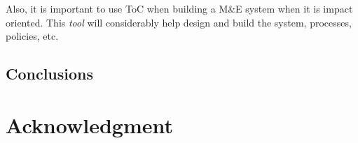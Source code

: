 \documentclass[conference]{IEEEtran}
\begin{document}
Also, it is important to use ToC when building a M\&E system when it is impact oriented. This \textit{tool} will considerably help design and build the system, processes, policies, etc.\cite{hearn_when_2016}

\subsection{Conclusions} 

\section*{Acknowledgment}
\vspace{12pt}


\end{document}
